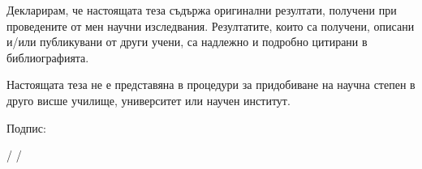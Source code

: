 \documentclass[12pt,bulgarian,singlespacing,headsepline,oneside,openany]{thesis}
\begin{document}

\begin{declaration}

\vspace{2cm}

Декларирам, че настоящата теза съдържа оригинални резултати, получени при проведените от мен научни изследвания. Резултатите, които са получени, описани и/или публикувани от други учени, са надлежно и подробно цитирани в библиографията.

\vspace{0.5cm}

Настоящата теза не е представяна в процедури за придобиване на научна степен в друго висше училище, университет или научен институт.

\vspace{2cm}

\hspace{4cm}
Подпис: 

\vspace{0.25cm}

\hspace{5cm}
/ \aname /
\end{declaration}


\newpage
\tableofcontents


\printglossary[type=\acronymtype,title={Списък с абревиатурите}]


\newpage

\end{document}
